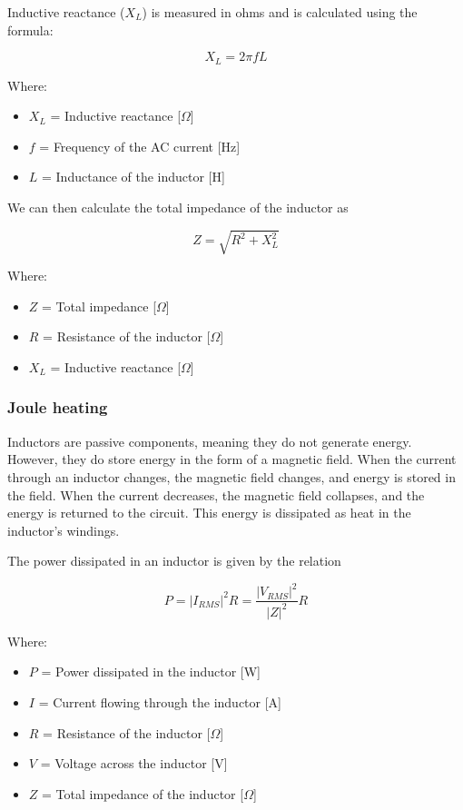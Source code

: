 Inductive reactance (\(X_L\)) is measured in ohms and is calculated using the formula:

\begin{equation}
    X_L = 2\pi fL
\end{equation}

Where:
\begin{itemize}
    \item \( X_L \) = Inductive reactance [\(\Omega\)]
    \item \( f \) = Frequency of the AC current [Hz]
    \item \( L \) = Inductance of the inductor [H]
\end{itemize}

We can then calculate the total impedance of the inductor as

\begin{equation}
    Z = \sqrt{R^2 + X_L^2}
\end{equation}

Where:
\begin{itemize}
    \item \( Z \) = Total impedance [\(\Omega\)]
    \item \( R \) = Resistance of the inductor [\(\Omega\)]
    \item \( X_L \) = Inductive reactance [\(\Omega\)]
\end{itemize}

\subsubsection{Joule heating}
Inductors are passive components, meaning they do not generate energy. However, they do store energy in the form of a magnetic field. When the current through an inductor changes, the magnetic field changes, and energy is stored in the field. When the current decreases, the magnetic field collapses, and the energy is returned to the circuit. This energy is dissipated as heat in the inductor's windings.

The power dissipated in an inductor is given by the relation

\begin{equation}
    P = |I_{RMS}|^2R = \frac{|V_{RMS}|^2}{|Z|^2}R\label{eq: Joule_heating}
\end{equation}

Where:
\begin{itemize}
    \item \( P \) = Power dissipated in the inductor [W]
    \item \( I \) = Current flowing through the inductor [A]
    \item \( R \) = Resistance of the inductor [\(\Omega\)]
    \item \( V \) = Voltage across the inductor [V]
    \item \( Z \) = Total impedance of the inductor [\(\Omega\)]
\end{itemize}

